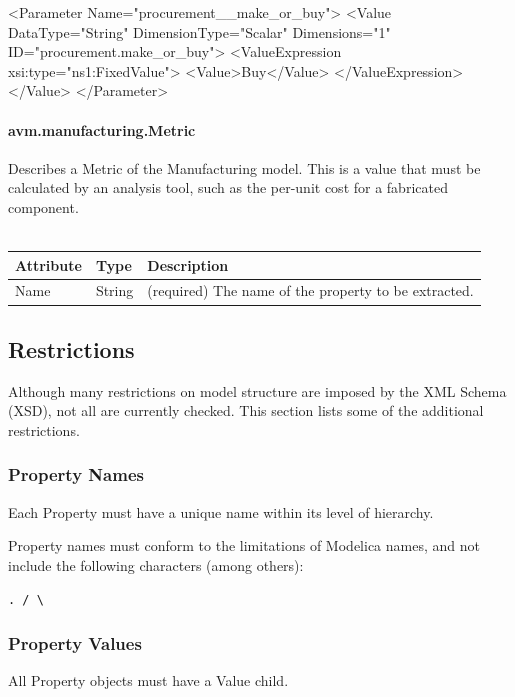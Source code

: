 \begin{MyVerbatim}
    <Parameter Name="procurement__make_or_buy">
      <Value DataType="String" DimensionType="Scalar" Dimensions="1" 
        ID="procurement.make_or_buy">
        <ValueExpression xsi:type="ns1:FixedValue">
          <Value>Buy</Value>
        </ValueExpression>
      </Value>
    </Parameter>
\end{MyVerbatim}

\paragraph{avm.manufacturing.Metric}
Describes a Metric of the Manufacturing model. This is a value that must be calculated by an analysis tool, such as the per-unit cost for a fabricated component.
\\ \\
\begin{tabular}{ l l p{9cm} }
\textbf{Attribute} & \textbf{Type} & \textbf{Description} \\ \hline
Name & String & (required) The name of the property to be extracted. \\ \hline
\end{tabular}

\subsection{Restrictions}
Although many restrictions on model structure are imposed by the XML Schema (XSD), not all are currently checked. This section lists some of the additional restrictions.

\subsubsection{Property Names}
Each Property must have a unique name within its level of hierarchy.

Property names must conform to the limitations of Modelica names, and not include the following characters (among others): 
\begin{verbatim}
. / \
\end{verbatim}

\subsubsection{Property Values}
All Property objects must have a Value child.

